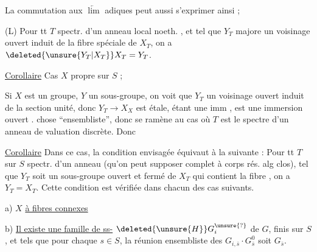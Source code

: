
La commutation aux $\underleftarrow{\lim}$ adiques peut aussi s'exprimer ainsi ;

(L) Pour tt  $T$  spectr. d'un anneau local noeth. , et tel que $Y_T$ majore un voisinage ouvert induit de la fibre spéciale de $X_T$, on a $\deleted{\unsure{Y_T|X_T}}X_T=Y_T$.

\uline{Corollaire} Cas $X$ propre sur $S$ ; 

Si $X$ est un groupe, $Y$ un sous-groupe, on voit que $Y_T$  un voisinage ouvert induit de la section unité, donc $Y_T\to X_X$ est  étale,  étant une imm , est une immersion ouvert .    chose ``ensembliste'', donc se ramène au cas où $T$ est le spectre d'un anneau de valuation discrète. Donc

\uline{Corollaire} Dans ce cas, la condition envisagée équivaut à la suivante : Pour tt $T$ sur $S$ spectr. d'un anneau   (qu'on peut supposer complet à corps rés. alg clos), tel que $Y_T$ soit un sous-groupe ouvert et fermé de $X_T$ qui contient la fibre , on a $Y_T=X_T$. Cette condition est vérifiée dans chacun des cas suivants.

a) $X$ \uline{à fibres connexes}

b) \uline{Il existe une famille de ss-} $\deleted{\unsure{H}}G_i^{\unsure{?}}$ de $G$, finis sur $S$, et tels que pour chaque $s\in S$, la réunion ensembliste des $G_{i,\bar s}\cdot G_{\bar s}^{0}$ soit $G_{\bar s}$.
